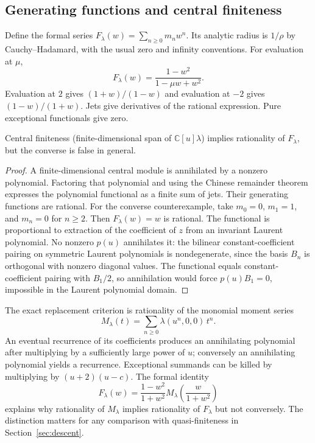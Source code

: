 \subsection{Generating functions and central finiteness}
Define the formal series $F_\lambda(w)=\sum_{n\ge0}m_nw^n$. Its analytic radius is $1/\rho$ by Cauchy--Hadamard, with the usual zero and infinity conventions. For evaluation at $\mu$,
\[
F_\lambda(w)=\frac{1-w^2}{1-\mu w+w^2}.
\]
Evaluation at $2$ gives $(1+w)/(1-w)$ and evaluation at $-2$ gives $(1-w)/(1+w)$. Jets give derivatives of the rational expression. Pure exceptional functionals give zero.
\begin{proposition}\label{prop:duality-rational}
Central finiteness (finite-dimensional span of $\mathbb C[u]\lambda$) implies rationality of $F_\lambda$, but the converse is false in general.
\end{proposition}
\begin{proof}
A finite-dimensional central module is annihilated by a nonzero polynomial. Factoring that polynomial and using the Chinese remainder theorem expresses the polynomial functional as a finite sum of jets. Their generating functions are rational. For the converse counterexample, take $m_0=0$, $m_1=1$, and $m_n=0$ for $n\ge2$. Then $F_\lambda(w)=w$ is rational. The functional is proportional to extraction of the coefficient of $z$ from an invariant Laurent polynomial. No nonzero $p(u)$ annihilates it: the bilinear constant-coefficient pairing on symmetric Laurent polynomials is nondegenerate, since the basis $B_n$ is orthogonal with nonzero diagonal values. The functional equals constant-coefficient pairing with $B_1/2$, so annihilation would force $p(u)B_1=0$, impossible in the Laurent polynomial domain.
\end{proof}
The exact replacement criterion is rationality of the monomial moment series
\[
M_\lambda(t)=\sum_{n\ge0}\lambda(u^n,0,0)\,t^n .
\]
An eventual recurrence of its coefficients produces an annihilating polynomial after multiplying by a sufficiently large power of $u$; conversely an annihilating polynomial yields a recurrence. Exceptional summands can be killed by multiplying by $(u+2)(u-c)$. The formal identity
\[
F_\lambda(w)=\frac{1-w^2}{1+w^2}
M_\lambda\left(\frac{w}{1+w^2}\right)
\]
explains why rationality of $M_\lambda$ implies rationality of $F_\lambda$ but not conversely. The distinction matters for any comparison with quasi-finiteness in Section~\ref{sec:descent}.

